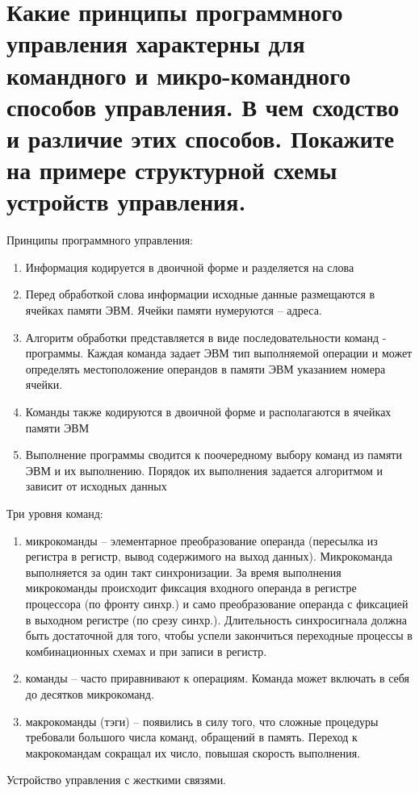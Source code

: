\documentclass[unicode, 12pt, a4paper, oneside]{article}
\begin{document}
\section{Какие принципы программного управления характерны для командного и микро-командного способов управления. В чем сходство и различие этих способов. Покажите на примере структурной схемы устройств управления.}

Принципы программного управления:
\begin{enumerate}
\item Информация кодируется в двоичной форме и разделяется на слова
\item Перед обработкой слова информации исходные данные размещаются в ячейках памяти ЭВМ. Ячейки памяти нумеруются – адреса.
\item Алгоритм обработки представляется в виде последовательности команд - программы. Каждая команда задает ЭВМ тип выполняемой операции и может определять местоположение операндов в памяти ЭВМ указанием  номера ячейки.
\item Команды также кодируются в двоичной форме и располагаются в ячейках памяти ЭВМ
\item Выполнение программы сводится к поочередному выбору команд из памяти ЭВМ и их выполнению. Порядок их выполнения задается алгоритмом и зависит от исходных данных
\end{enumerate}

Три уровня команд:
\begin{enumerate}
\item микрокоманды – элементарное преобразование операнда (пересылка из регистра в регистр, вывод содержимого на выход данных). Микрокоманда выполняется за один такт синхронизации. За время выполнения микрокоманды происходит фиксация входного операнда в регистре процессора (по фронту синхр.) и само преобразование операнда с фиксацией в выходном регистре (по срезу синхр.). Длительность синхросигнала должна быть достаточной для того, чтобы успели закончиться переходные процессы в комбинационных схемах и при записи в регистр.
\item команды – часто приравнивают к операциям. Команда может включать в себя до десятков микрокоманд.
\item макрокоманды (тэги) – появились в силу того, что сложные процедуры требовали большого числа команд, обращений в память. Переход к макрокомандам сокращал их число, повышая скорость выполнения.
\end{enumerate}

Устройство управления с жесткими связями.
\end{document}
